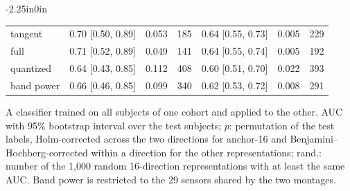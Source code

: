 \begin{table}[!ht]
\begin{adjustwidth}{-2.25in}{0in}
\begin{tabular}{lcccccc}
tangent & 0.70 [0.50, 0.89] & 0.053 & 185 & 0.64 [0.55, 0.73] & 0.005 & 229 \\
full & 0.71 [0.52, 0.89] & 0.049 & 141 & 0.64 [0.55, 0.74] & 0.005 & 192 \\
quantized & 0.64 [0.43, 0.85] & 0.112 & 408 & 0.60 [0.51, 0.70] & 0.022 & 393 \\
band power & 0.66 [0.46, 0.85] & 0.099 & 340 & 0.62 [0.53, 0.72] & 0.008 & 291 \\
\bottomrule
\end{tabular}
\begin{flushleft}\footnotesize A classifier trained on all subjects of one cohort and applied to the other. AUC with 95\% bootstrap interval over the test subjects; $p$: permutation of the test labels, Holm-corrected across the two directions for anchor-16 and Benjamini--Hochberg-corrected within a direction for the other representations; rand.: number of the 1{,}000 random 16-direction representations with at least the same AUC. Band power is restricted to the 29 sensors shared by the two montages.\end{flushleft}
\end{adjustwidth}
\end{table}
